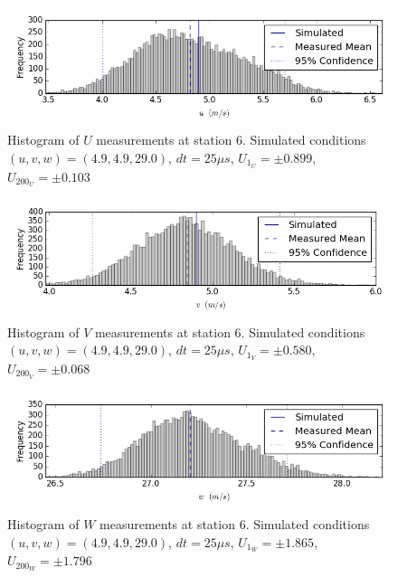 \begin{figure}[H]
\centering
\includegraphics[width=6in]{figs/Ely_May28th06001/uncertainty_Ely_May28th06001_U}
\caption{Histogram of $U$ measurements at station 6. Simulated conditions $(u,v,w)=(4.9, 4.9, 29.0)$, $dt=25 \mu s$, $U_{1_{U}}=\pm 0.899$, $U_{200_{U}}=\pm 0.103$}
\label{fig:uncertainty_Ely_May28th06001_U}
\end{figure}


\begin{figure}[H]
\centering
\includegraphics[width=6in]{figs/Ely_May28th06001/uncertainty_Ely_May28th06001_V}
\caption{Histogram of $V$ measurements at station 6. Simulated conditions $(u,v,w)=(4.9, 4.9, 29.0)$, $dt=25 \mu s$, $U_{1_{V}}=\pm 0.580$, $U_{200_{V}}=\pm 0.068$}
\label{fig:uncertainty_Ely_May28th06001_V}
\end{figure}


\begin{figure}[H]
\centering
\includegraphics[width=6in]{figs/Ely_May28th06001/uncertainty_Ely_May28th06001_W}
\caption{Histogram of $W$ measurements at station 6. Simulated conditions $(u,v,w)=(4.9, 4.9, 29.0)$, $dt=25 \mu s$, $U_{1_{W}}=\pm 1.865$, $U_{200_{W}}=\pm 1.796$}
\label{fig:uncertainty_Ely_May28th06001_W}
\end{figure}


